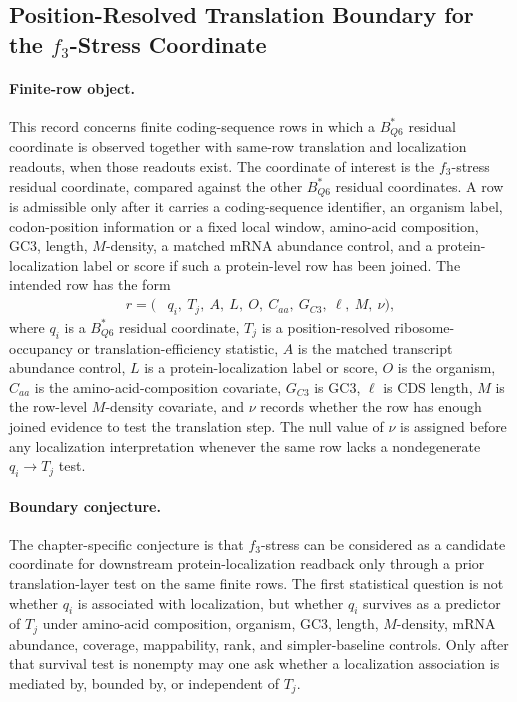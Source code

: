 \subsection{Position-Resolved Translation Boundary for the $f_3$-Stress Coordinate}
\label{sec:q6-f3-stress-position-resolved-translation-localization-boundary-cross-layer}

\paragraph{Finite-row object.}
This record concerns finite coding-sequence rows in which a $B^*_{Q6}$ residual coordinate is observed together with same-row translation and localization readouts, when those readouts exist.  The coordinate of interest is the $f_3$-stress residual coordinate, compared against the other $B^*_{Q6}$ residual coordinates.  A row is admissible only after it carries a coding-sequence identifier, an organism label, codon-position information or a fixed local window, amino-acid composition, GC3, length, $M$-density, a matched mRNA abundance control, and a protein-localization label or score if such a protein-level row has been joined.  The intended row has the form
$$
\begin{aligned}
 r = (&q_i,\ T_j,\ A,\ L,\ O,\ C_{aa},\ G_{C3},\ \ell,\ M,\ \nu),
\end{aligned}
$$
where $q_i$ is a $B^*_{Q6}$ residual coordinate, $T_j$ is a position-resolved ribosome-occupancy or translation-efficiency statistic, $A$ is the matched transcript abundance control, $L$ is a protein-localization label or score, $O$ is the organism, $C_{aa}$ is the amino-acid-composition covariate, $G_{C3}$ is GC3, $\ell$ is CDS length, $M$ is the row-level $M$-density covariate, and $\nu$ records whether the row has enough joined evidence to test the translation step.  The null value of $\nu$ is assigned before any localization interpretation whenever the same row lacks a nondegenerate $q_i \to T_j$ test.

\paragraph{Boundary conjecture.}
The chapter-specific conjecture is that $f_3$-stress can be considered as a candidate coordinate for downstream protein-localization readback only through a prior translation-layer test on the same finite rows.  The first statistical question is not whether $q_i$ is associated with localization, but whether $q_i$ survives as a predictor of $T_j$ under amino-acid composition, organism, GC3, length, $M$-density, mRNA abundance, coverage, mappability, rank, and simpler-baseline controls.  Only after that survival test is nonempty may one ask whether a localization association is mediated by, bounded by, or independent of $T_j$.

